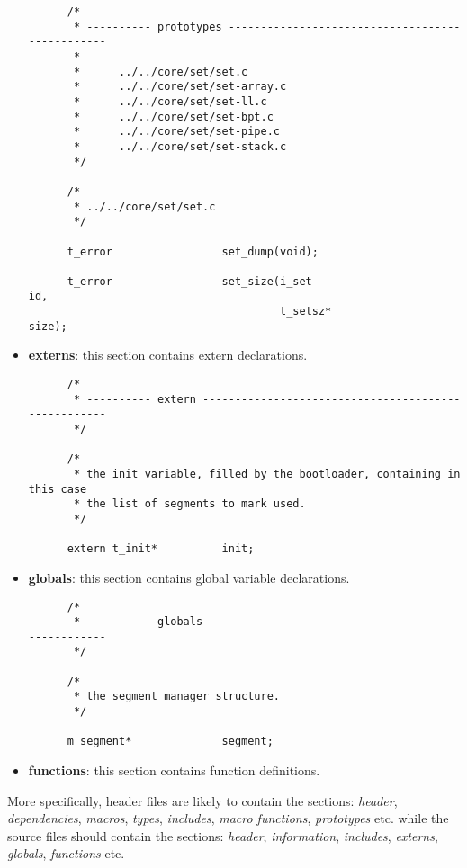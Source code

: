 \begin{itemize}
    \begin{verbatim}
      /*
       * ---------- prototypes ------------------------------------------------
       *
       *      ../../core/set/set.c
       *      ../../core/set/set-array.c
       *      ../../core/set/set-ll.c
       *      ../../core/set/set-bpt.c
       *      ../../core/set/set-pipe.c
       *      ../../core/set/set-stack.c
       */

      /*
       * ../../core/set/set.c
       */

      t_error                 set_dump(void);

      t_error                 set_size(i_set                          id,
                                       t_setsz*                       size);
    \end{verbatim}
  \item
    \textbf{externs}: this section contains extern declarations.

    \begin{verbatim}
      /*
       * ---------- extern ----------------------------------------------------
       */

      /*
       * the init variable, filled by the bootloader, containing in this case
       * the list of segments to mark used.
       */

      extern t_init*          init;
    \end{verbatim}
  \item
    \textbf{globals}: this section contains global variable declarations.

    \begin{verbatim}
      /*
       * ---------- globals ---------------------------------------------------
       */

      /*
       * the segment manager structure.
       */

      m_segment*              segment;
    \end{verbatim}
  \item
    \textbf{functions}: this section contains function definitions.
\end{itemize}

More specifically, header files are likely to contain the sections:
\textit{header}, \textit{dependencies}, \textit{macros}, \textit{types},
\textit{includes}, \textit{macro functions}, \textit{prototypes} etc. while
the source files should contain the sections: \textit{header},
\textit{information}, \textit{includes}, \textit{externs}, \textit{globals},
\textit{functions} etc.

